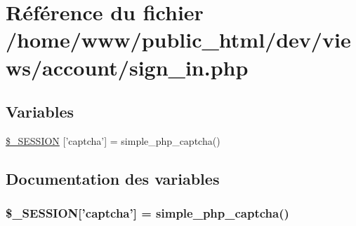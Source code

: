 \hypertarget{sign__in_8php}{\section{Référence du fichier /home/www/public\-\_\-html/dev/views/account/sign\-\_\-in.php}
\label{sign__in_8php}
}
\subsection*{Variables}
\begin{DoxyCompactItemize}
\item 
\hyperlink{sign__in_8php_a79e5cbd2296bd10a361f2fae6ab637c7}{\$\-\_\-\-S\-E\-S\-S\-I\-O\-N} \mbox{[}'captcha'\mbox{]} = simple\-\_\-php\-\_\-captcha()
\end{DoxyCompactItemize}


\subsection{Documentation des variables}
\hypertarget{sign__in_8php_a79e5cbd2296bd10a361f2fae6ab637c7}{
\subsubsection[{\$\-\_\-\-S\-E\-S\-S\-I\-O\-N}]{\setlength{\rightskip}{0pt plus 5cm}\$\-\_\-\-S\-E\-S\-S\-I\-O\-N\mbox{[}'captcha'\mbox{]} = simple\-\_\-php\-\_\-captcha()}}\label{sign__in_8php_a79e5cbd2296bd10a361f2fae6ab637c7}
